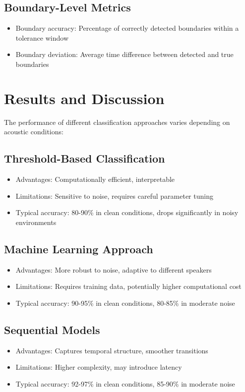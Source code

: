 \documentclass[10pt,journal,compsoc]{IEEEtran}
\begin{document}
\subsection{Boundary-Level Metrics}
\begin{itemize}
    \item Boundary accuracy: Percentage of correctly detected boundaries within a tolerance window
    \item Boundary deviation: Average time difference between detected and true boundaries
\end{itemize}

\section{Results and Discussion}
The performance of different classification approaches varies depending on acoustic conditions:

\subsection{Threshold-Based Classification}
\begin{itemize}
    \item Advantages: Computationally efficient, interpretable
    \item Limitations: Sensitive to noise, requires careful parameter tuning
    \item Typical accuracy: 80-90\% in clean conditions, drops significantly in noisy environments
\end{itemize}

\subsection{Machine Learning Approach}
\begin{itemize}
    \item Advantages: More robust to noise, adaptive to different speakers
    \item Limitations: Requires training data, potentially higher computational cost
    \item Typical accuracy: 90-95\% in clean conditions, 80-85\% in moderate noise
\end{itemize}

\subsection{Sequential Models}
\begin{itemize}
    \item Advantages: Captures temporal structure, smoother transitions
    \item Limitations: Higher complexity, may introduce latency
    \item Typical accuracy: 92-97\% in clean conditions, 85-90\% in moderate noise
\end{itemize}
\end{document}
